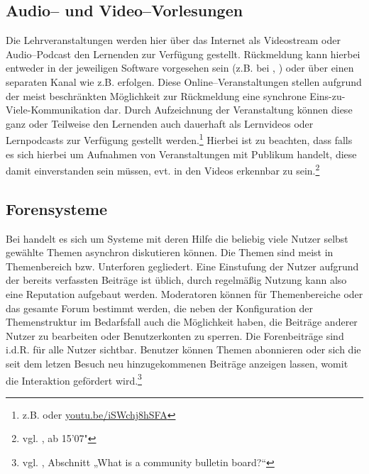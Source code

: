 \subsection{Audio– und Video–Vorlesungen} %
\label{sub:audio_und_video_vorlesungen}
Die Lehrveranstaltungen werden hier über das Internet als Videostream oder Audio–Podcast den Lernenden zur Verfügung gestellt. Rückmeldung kann hierbei entweder in der jeweiligen Software vorgesehen sein (z.B. bei , ) oder über einen separaten Kanal wie z.B.  erfolgen. Diese Online–Veranstaltungen stellen aufgrund der meist beschränkten Möglichkeit zur Rückmeldung eine synchrone Eins-zu-Viele-Kommunikation dar. Durch Aufzeichnung der Veranstaltung können diese ganz oder Teilweise den Lernenden auch dauerhaft als Lernvideos oder Lernpodcasts zur Verfügung gestellt werden.\footnote{z.B.  oder \url{youtu.be/iSWchj8hSFA}} Hierbei ist zu beachten, dass falls es sich hierbei um Aufnahmen von Veranstaltungen mit Publikum handelt, diese damit einverstanden sein müssen, evt. in den Videos erkennbar zu sein.\footnote{vgl. \cite{cs50}, ab 15'07" }

\subsection{Forensysteme} %
\label{sub:forensysteme}
Bei  handelt es sich um Systeme mit deren Hilfe die beliebig viele Nutzer selbst gewählte Themen asynchron diskutieren können. Die Themen sind meist in Themenbereich bzw. Unterforen gegliedert. Eine Einstufung der Nutzer aufgrund der bereits verfassten Beiträge ist üblich, durch regelmäßig Nutzung kann also eine Reputation aufgebaut werden. Moderatoren können für Themenbereiche oder das gesamte Forum bestimmt werden, die neben der Konfiguration der Themenstruktur im Bedarfsfall auch die Möglichkeit haben, die Beiträge anderer Nutzer zu bearbeiten oder Benutzerkonten zu sperren. Die Forenbeiträge sind i.d.R. für alle Nutzer sichtbar. Benutzer können Themen abonnieren oder sich die seit dem letzen Besuch neu hinzugekommenen Beiträge anzeigen lassen, womit die Interaktion gefördert wird.\footnote{vgl. \cite{vbulletin}, Abschnitt „What is a community bulletin board?“}

